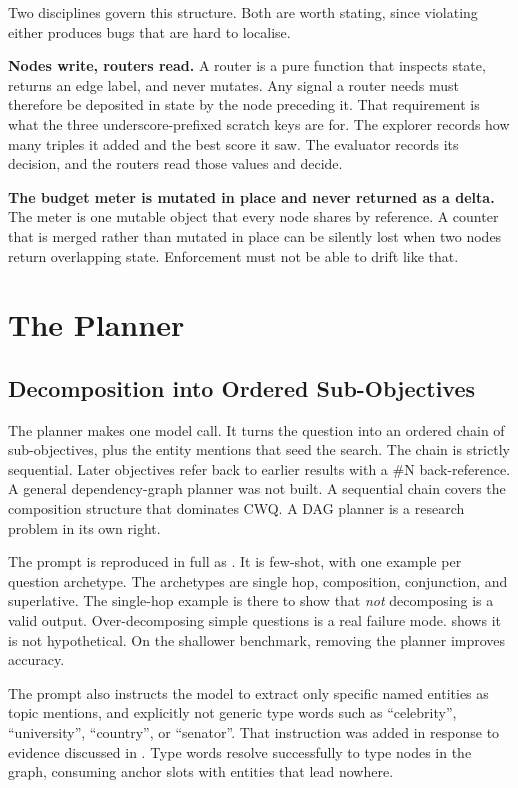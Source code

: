 Two disciplines govern this structure. Both are worth stating, since violating
either produces bugs that are hard to localise.

\textbf{Nodes write, routers read.} A router is a pure function that inspects
state, returns an edge label, and never mutates. Any signal a router needs must
therefore be deposited in state by the node preceding it. That requirement is
what the three underscore-prefixed scratch keys are for. The explorer records
how many triples it added and the best score it saw. The evaluator records its
decision, and the routers read those values and decide.

\textbf{The budget meter is mutated in place and never returned as a delta.}
The meter is one mutable object that every node shares by reference. A counter
that is merged rather than mutated in place can be silently lost when two nodes
return overlapping state. Enforcement must not be able to drift like that.

\section{The Planner}\label{sec:planner}

\subsection{Decomposition into Ordered Sub-Objectives}

The planner makes one model call. It turns the question into an
ordered chain of sub-objectives, plus the entity mentions that seed the search.
The chain is strictly sequential. Later objectives refer back to earlier results
with a \textsf{\#N} back-reference. A general dependency-graph planner was not
built. A sequential chain covers the composition structure that dominates CWQ. A
DAG planner is a research problem in its own right.

The prompt is reproduced in full as . It is few-shot,
with one example per question archetype. The archetypes are single hop,
composition, conjunction, and superlative. The single-hop example is there to
show that \emph{not} decomposing is a valid output. Over-decomposing simple
questions is a real failure mode.  shows it is not
hypothetical. On the shallower benchmark, removing the planner improves
accuracy.

The prompt also instructs the model to extract only specific named entities as
topic mentions, and explicitly not generic type words such as ``celebrity'',
``university'', ``country'', or ``senator''. That instruction was added in
response to evidence discussed in . Type words
resolve successfully to type nodes in the graph, consuming anchor slots with
entities that lead nowhere.

